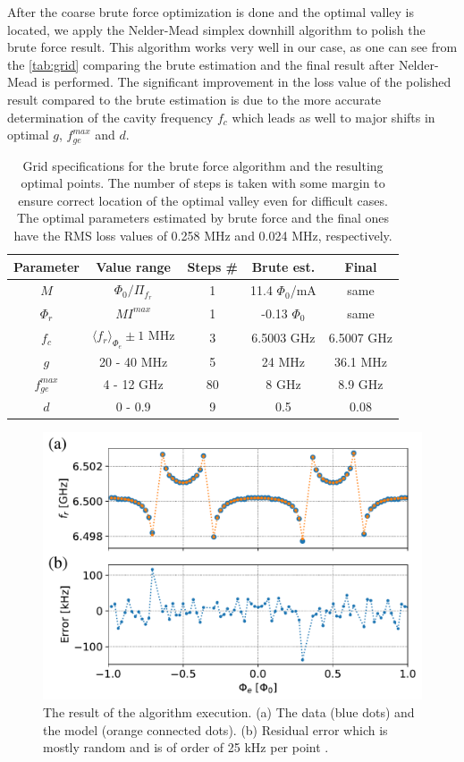 \documentclass[%
 aip,
 amsmath,amssymb,
 reprint,%
]{revtex4-1}
\begin{document}
After the coarse brute force optimization is done and the optimal valley is located, we apply the Nelder-Mead simplex downhill algorithm to polish the brute force result. This algorithm works very well in our case, as one can see from the \autoref{tab:grid} comparing the brute estimation and  the final result after Nelder-Mead is performed. The significant improvement in the loss value of the polished result compared to the brute estimation is due to the more accurate determination of the cavity frequency $f_c$ which leads as well to major shifts in optimal $g$, $f_{ge}^{max}$ and $d$.

\begin{table}
\centering
\begin{ruledtabular}
\begin{tabular}{ccccc} 
Parameter & Value range & Steps \# & Brute est. & Final \\ 
\hline
$M$ & $\Phi_0/\Pi_{f_r}$ & 1 & 11.4 $\Phi_0$/mA &  same \\
$\Phi_r$ & $M I^{max}$ & 1 & -0.13 $\Phi_0$ & same \\
$f_c$ & $\langle f_r \rangle_{\Phi_e} \pm 1$ MHz & 3 & 6.5003 GHz & 6.5007 GHz\\
$g$ & 20 - 40 MHz & 5 & 24 MHz & 36.1 MHz \\
$f_{ge}^{max}$ &  4 - 12 GHz & 80 & 8 GHz & 8.9 GHz\\
$d$& 0 - 0.9 & 9 & 0.5 & 0.08\\ 
\end{tabular} 
\end{ruledtabular}
\caption{Grid specifications for the brute force algorithm and the resulting optimal points. The number of steps is taken with some margin to ensure correct location of the optimal valley even for difficult cases. The optimal parameters estimated by brute force and the final ones have the RMS loss values of 0.258 MHz and 0.024 MHz, respectively.}
\label{tab:grid}
\end{table}


\begin{figure}
\centering
\includegraphics[width=\linewidth]{fit}
\caption{The result of the algorithm execution. (a) The data (blue dots) and the model (orange connected dots). (b) Residual error which is mostly random and is of order of 25 kHz per point .}
\label{fig:anti_fit}
\end{figure}
\end{document}
